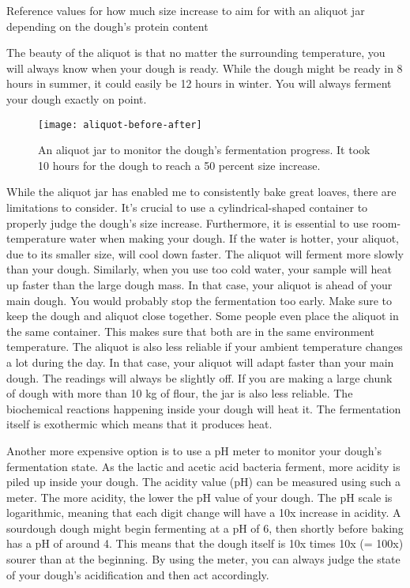 \begin{table}[!htb]
    \begin{center}
        
        \caption{Reference values for how much size increase to aim for with
        an aliquot jar depending on the dough's protein content}
    \end{center}
\end{table}

The beauty of the aliquot is that no matter the surrounding
temperature, you will always know when your dough is ready.
While the dough might be ready in 8 hours in summer, it could
easily be 12 hours in winter. You will always ferment your
dough exactly on point.


\begin{figure}[!htb]
  \texttt{[image: aliquot-before-after]}
  \caption{An aliquot jar to monitor the dough's fermentation progress.
  It took 10 hours for the dough to reach a 50 percent size increase.}
\end{figure}

While the aliquot jar has enabled me to consistently bake
great loaves, there are limitations to consider. It's crucial
to use a cylindrical-shaped container to properly judge
the dough's size increase. Furthermore, it is essential
to use room-temperature water when making your dough. If the
water is hotter, your aliquot, due to its smaller size,
will cool down faster. The aliquot will ferment more slowly
than your dough. Similarly, when you use too cold water,
your sample will heat up faster than the large dough mass.
In that case, your aliquot is ahead of your main dough. You
would probably stop the fermentation too early. Make sure
to keep the dough and aliquot close together. Some people even
place the aliquot in the same container. This makes sure that
both are in the same environment temperature. The aliquot
is also less reliable if your ambient temperature changes
a lot during the day. In that case, your aliquot will adapt
faster than your main dough. The readings will always be slightly
off. If you are making a large chunk of dough with more
than 10 kg of flour, the jar is also less reliable. The biochemical
reactions happening inside your dough will heat it.
The fermentation itself is exothermic which means
that it produces heat.

Another more expensive option is to use a pH meter
to monitor your dough's fermentation state. As the lactic
and acetic acid bacteria ferment, more acidity is piled
up inside your dough. The acidity value (pH) can be
measured using such a meter. The more acidity, the lower the pH
value of your dough. The pH scale is logarithmic, meaning
that each digit change will have a 10x increase in acidity.
A sourdough dough might begin fermenting at a pH of 6,
then shortly before baking has a pH of around 4. This means
that the dough itself is 10x times 10x (= 100x) sourer
than at the beginning. By using the meter, you can always
judge the state of your dough's acidification and then act
accordingly.


